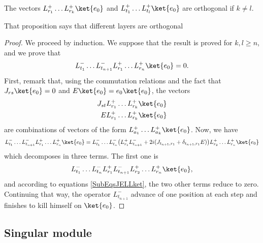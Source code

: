 \begin{proposition}
The vectors $L^+_{r_1}\ldots L^+_{r_k}\ket{e_0}$ and $L^+_{t_1}\ldots L^+_{t_l}\ket{e_0}$ are orthogonal if $k\neq l$.
\end{proposition}
That proposition says that different layers are orthogonal

\begin{proof}
We proceed by induction. We suppose that the result is proved for $k,l\geq n$, and we prove that
\begin{equation}
	L^-_{t_1}\ldots L^-_{t_{n+1}}L^+_{r_1}\ldots L^+_{r_n}\ket{e_0}=0.
\end{equation}
First, remark that, using the commutation relations and the fact that $J_{rs}\ket{e_0}=0$ and $E\ket{e_0}=e_0\ket{e_0}$, the vectors
\begin{subequations}		\label{SubEqsJELLket}
	\begin{align}
		J_{st}L^+_{r_1}\ldots L^+_{r_k}\ket{e_0}\\
		EL^+_{r_1}\ldots L^+_{r_k}\ket{e_0}
	\end{align}
\end{subequations}
are combinations of vectors of the form $L^+_{a_1}\ldots L^+_{a_k}\ket{e_0}$. Now, we have
\begin{equation}
	L^-_{t_1}\ldots L^-_{t_{n+1}}L^+_{r_1}\ldots L^+_{r_n}\ket{e_0}= L^-_{t_1}\ldots L^-_{t_n}\big( L^+_{r_1}L^-_{t_{n+1}}+2i(J_{t_{n+1},r_1} + \delta_{t_{n+1},r_1}E ) \big)L^+_{r_2}\ldots L^+_{r_n}\ket{e_0}
\end{equation}
which decomposes in three terms. The first one is
\begin{equation}
	L^-_{t_1}\ldots L^-_{t_n}L^+_{r_1}L^-_{t_{n+1}}L^+_{r_2}\ldots L^+_{r_n}\ket{e_0},
\end{equation}
and according to equations \eqref{SubEqsJELLket}, the two other terms reduce to zero. Continuing that way, the operator $L^-_{t_{n+1}}$ advance of one position at each step and finishes to kill himself on $\ket{e_0}$.
\end{proof}

					\subsection{Singular module}

